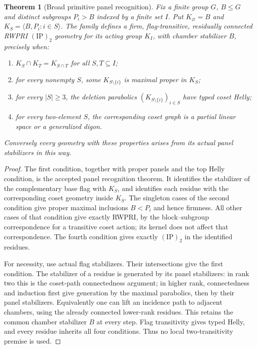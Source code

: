 \documentclass[11pt]{article}
\newtheorem{theorem}{Theorem}\newtheorem{lemma}{Lemma}
\newcommand{\ip}{\mathrm{(IP)}_2}
\begin{document}
\begin{theorem}[Broad primitive panel recognition]
Fix a finite group $G$, $B\leq G$ and distinct subgroups $P_i>B$ indexed by
a finite set $I$. Put $K_\varnothing=B$ and
$K_S=\langle B,P_i:i\in S\rangle$. The family defines a firm,
flag-transitive, residually connected RWPRI $\ip$ geometry for its acting
group $K_I$, with chamber stabilizer $B$, precisely when:
\begin{enumerate}
\item $K_S\cap K_T=K_{S\cap T}$ for all $S,T\subseteq I$;
\item for every nonempty $S$, some $K_{S\setminus\{i\}}$ is maximal
proper in $K_S$;
\item for every $|S|\geq3$, the deletion parabolics
$(K_{S\setminus\{i\}})_{i\in S}$ have typed coset Helly;
\item for every two-element $S$, the corresponding coset graph is a
partial linear space or a generalized digon.
\end{enumerate}
Conversely every geometry with these properties arises from its actual
panel stabilizers in this way.
\end{theorem}
\begin{proof}
The first condition, together with proper panels and the top Helly condition,
is the accepted panel recognition theorem. It identifies the stabilizer of the complementary
base flag with $K_S$, and identifies each residue with the corresponding
coset geometry inside $K_S$. The singleton cases of the second condition
give proper maximal inclusions $B<P_i$ and hence firmness. All other cases
of that condition give exactly RWPRI, by the block--subgroup correspondence
for a transitive coset action; its kernel does not affect that correspondence.
The fourth condition gives exactly $\ip$ in the identified residues.

For necessity, use actual flag stabilizers. Their intersections give the
first condition. The stabilizer of a residue is generated by its panel
stabilizers: in rank two this is the coset-path connectedness argument; in
higher rank, connectedness and induction first give generation by the
maximal parabolics, then by their panel stabilizers. Equivalently one can
lift an incidence path to adjacent chambers, using the already connected
lower-rank residues. This retains the common chamber stabilizer $B$ at every
step. Flag transitivity gives typed Helly, and every residue inherits all
four conditions. Thus no local two-transitivity premise is used.
\end{proof}
\end{document}
